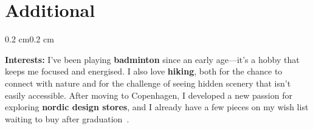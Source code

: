 \documentclass[10pt, letterpaper]{article}
\newenvironment{onecolentry}{
    \begin{adjustwidth}{0.2 cm}{0.2 cm}
}{
    \end{adjustwidth}
}
\newenvironment{twocolentry}[2][]{
    \onecolentry
    \def\secondColumn{#2}
    \setcolumnwidth{\fill, 4.5 cm}
    \begin{paracol}{2}
}{
    \switchcolumn \raggedleft \secondColumn
    \end{paracol}
    \endonecolentry
}
\begin{document}


    \section{Additional}
    \begin{onecolentry}
        \textbf{Interests:} I’ve been playing \textbf{badminton} since an early age—it’s a hobby that keeps me focused and energised. I also love \textbf{hiking}, both for the chance to connect with nature and for the challenge of seeing hidden scenery that isn’t easily accessible. After moving to Copenhagen, I developed a new passion for exploring \textbf{nordic design stores}, and I already have a few pieces on my wish list waiting to buy after graduation~\smiley{}.\\
    \end{onecolentry}
\end{document}
